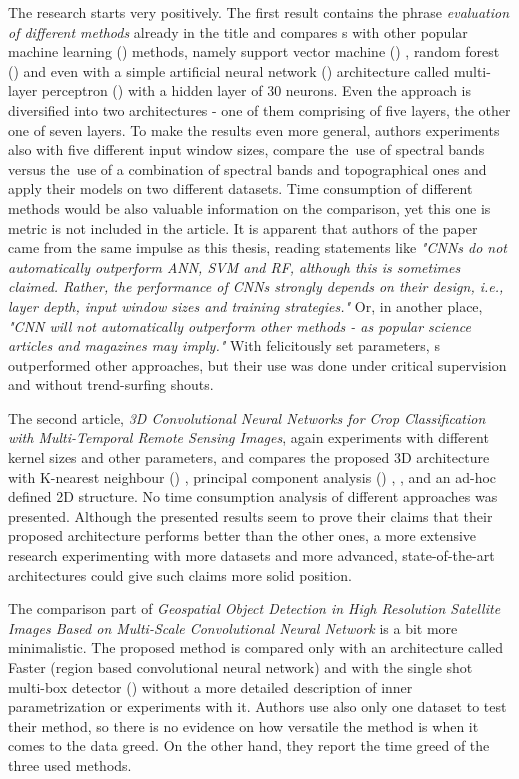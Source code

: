 The research starts very positively. The first result contains the phrase \textit{evaluation of different methods} already in the title and compares s with other popular machine learning () methods, namely support vector machine () \cite{svm}, random forest () \cite{rf} and even with a simple artificial neural network () architecture called multi-layer perceptron () \cite{mlp} with a hidden layer of 30 neurons. Even the  approach is diversified into two architectures - one of them comprising of five layers, the other one of seven layers. To make the results even more general, authors experiments also with five different input window sizes, compare the~use of spectral bands versus the~use of a combination of spectral bands and topographical ones and apply their models on two different datasets. Time consumption of different methods would be also valuable information on the comparison, yet this one is metric is not included in the article. It is apparent that authors of the paper came from the same impulse as this thesis, reading statements like \textit{"CNNs do not automatically outperform ANN, SVM and RF, although this is sometimes claimed. Rather, the performance of CNNs strongly depends on their design, i.e., layer depth, input window sizes and training strategies."} Or, in another place, \textit{"CNN will not automatically outperform other methods - as popular science articles and magazines may imply."} With felicitously set parameters, s outperformed other approaches, but their use was done under critical supervision and without trend-surfing shouts.

The second article, \textit{3D Convolutional Neural Networks for Crop Classification with Multi-Temporal Remote Sensing Images},  again experiments with different kernel sizes and other parameters, and compares the proposed 3D  architecture with K-nearest neighbour () \cite{knn}, principal component analysis () \cite{pca}, , and an ad-hoc defined 2D  structure. No time consumption analysis of different approaches was presented. Although the presented results seem to prove their claims that their proposed architecture performs better than the other ones, a more extensive research experimenting with more datasets and more advanced, state-of-the-art architectures could give such claims more solid position.

The comparison part of \textit{Geospatial Object Detection in High Resolution Satellite Images Based on Multi-Scale Convolutional Neural Network} is a bit more minimalistic. The proposed method is compared only with an architecture called Faster  (region based convolutional neural network) \cite{faster-rcnn} and with the single shot multi-box detector () \cite{ssd} without a more detailed description of inner parametrization or experiments with it. Authors use also only one dataset to test their method, so there is no evidence on how versatile the method is when it comes to the data greed. On the other hand, they report the time greed of the three used methods.

